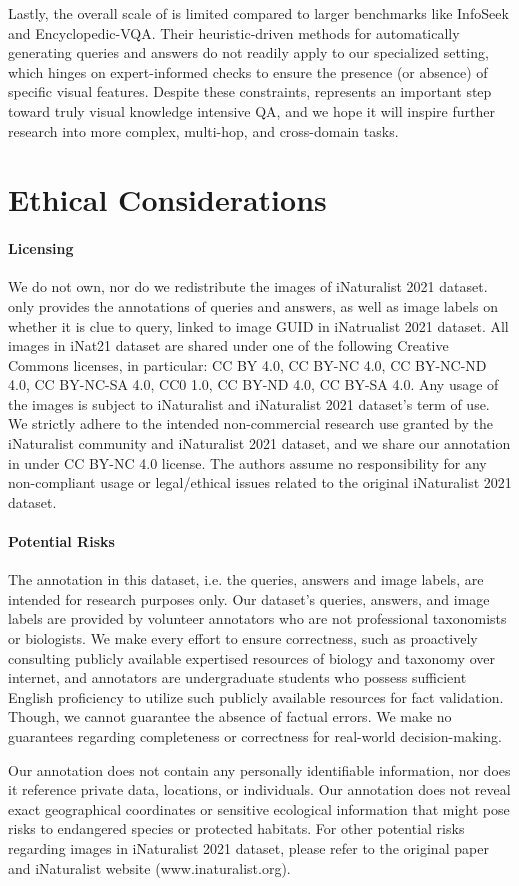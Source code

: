 Lastly, the overall scale of \ds is limited compared to larger benchmarks like InfoSeek and Encyclopedic-VQA. Their heuristic-driven methods for automatically generating queries and answers do not readily apply to our specialized setting, which hinges on expert-informed checks to ensure the presence (or absence) of specific visual features. Despite these constraints, \ds represents an important step toward truly visual knowledge intensive QA, and we hope it will inspire further research into more complex, multi-hop, and cross-domain tasks.

\section*{Ethical Considerations}
\paragraph{Licensing}
We do not own, nor do we redistribute the images of iNaturalist 2021 dataset. \ds only provides the annotations of queries and answers, as well as image labels on whether it is clue to query, linked to image GUID in iNatrualist 2021 dataset. All images in iNat21 dataset are shared under one of the following Creative Commons licenses, in particular: CC BY 4.0, CC BY-NC 4.0, CC BY-NC-ND 4.0, CC BY-NC-SA 4.0, CC0 1.0, CC BY-ND 4.0, CC BY-SA 4.0. Any usage of the images is subject to iNaturalist and iNaturalist 2021 dataset's term of use. We strictly adhere to the intended non-commercial research use granted by the iNaturalist community and iNaturalist 2021 dataset, and we share our annotation in \ds under CC BY-NC 4.0 license. The authors assume no responsibility for any non-compliant usage or legal/ethical issues related to the original iNaturalist 2021 dataset.

\paragraph{Potential Risks}
The annotation in this dataset, i.e. the queries, answers and image labels, are intended for research purposes only. Our dataset’s queries, answers, and image labels are provided by volunteer annotators who are not professional taxonomists or biologists. We make every effort to ensure correctness, such as proactively consulting publicly available expertised resources of biology and taxonomy over internet, and annotators are undergraduate students who possess sufficient English proficiency to utilize such publicly available resources for fact validation. Though, we cannot guarantee the absence of factual errors. We make no guarantees regarding completeness or correctness for real-world decision-making.

Our annotation does not contain any personally identifiable information, nor does it reference private data, locations, or individuals. Our annotation does not reveal exact geographical coordinates or sensitive ecological information that might pose risks to endangered species or protected habitats. For other potential risks regarding images in iNaturalist 2021 dataset, please refer to the original paper and iNaturalist website (www.inaturalist.org).